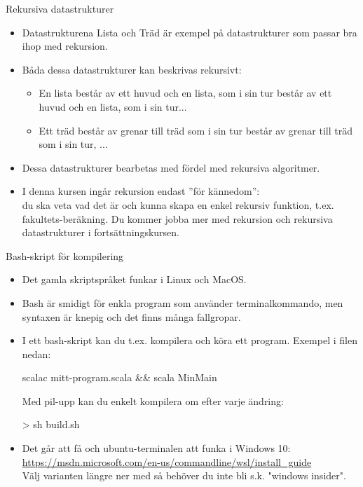 \begin{Slide}{Rekursiva datastrukturer}

\begin{itemize}
\item Datastrukturena Lista och Träd är exempel på datastrukturer som passar bra ihop med rekursion.
\item Båda dessa datastrukturer kan beskrivas rekursivt:
\begin{itemize}
\item En lista består av ett huvud och en lista, som i sin tur består av ett huvud och en lista, som i sin tur...
\item Ett träd består av grenar till träd som i sin tur består av grenar till träd som i sin tur, ...
\end{itemize}
\item Dessa datastrukturer bearbetas med fördel med rekursiva algoritmer.
\item I denna kursen ingår rekursion endast ''för kännedom'': \\ du ska veta vad det är och kunna skapa en enkel rekursiv funktion, t.ex. fakultets-beräkning. Du kommer jobba mer med rekursion och rekursiva datastrukturer i fortsättningskursen.
\end{itemize}
\end{Slide}


\begin{Slide}{Bash-skript för kompilering}\SlideFontSmall
\begin{itemize}
  \item Det gamla skriptspråket  funkar i Linux och MacOS.
  \item Bash är smidigt för enkla program som använder terminalkommando, men syntaxen är knepig och det finns många fallgropar.
  \item I ett bash-skript kan du t.ex. kompilera och köra ett program. Exempel i filen  nedan:
\begin{Code}
scalac mitt-program.scala && scala MinMain
\end{Code}
Med pil-upp kan du enkelt kompilera om efter varje ändring:
\begin{REPLnonum}
> sh build.sh
\end{REPLnonum}
  \item Det går att få  och ubuntu-terminalen att funka i Windows 10: \\
  {\SlideFontTiny\url{https://msdn.microsoft.com/en-us/commandline/wsl/install_guide}} \\
  Välj varianten längre ner med  så behöver du inte bli s.k. "windows insider".
\end{itemize}
\end{Slide}
